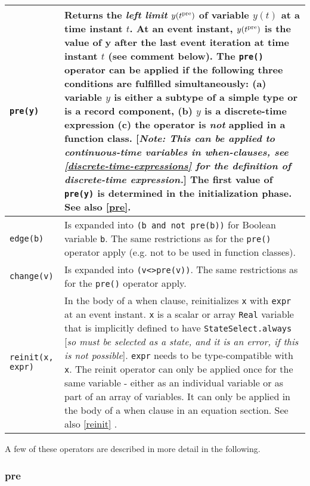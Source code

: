 \begin{longtable}{|p{5cm}|p{8cm}|}
\lstinline!pre(y)! & Returns the \emph{left limit} $y(t\textsuperscript{pre})$ of
variable $y(t)$ at a time instant $t$. At an event instant,
$y(t\textsuperscript{pre})$ is the value of y after the last event
iteration at time instant $t$ (see comment below). The \lstinline!pre()! operator can
be applied if the following three conditions are fulfilled
simultaneously: (a) variable $y$ is either a subtype of a simple type or
is a record component, (b) $y$ is a discrete-time expression (c) the
operator is \emph{not} applied in a function class. {[}\emph{Note: This
can be applied to continuous-time variables in when-clauses, see
\autoref{discrete-time-expressions} for the definition of discrete-time expression.}{]}
The first value of \lstinline!pre(y)! is determined in the initialization phase. See
also \autoref{pre}.\\ \hline

\lstinline!edge(b)! & Is expanded into \lstinline!(b and not pre(b))! for Boolean variable
\lstinline!b!. The same restrictions as for the \lstinline!pre()! operator apply (e.g. not to be
used in function classes).\\ \hline

\lstinline!change(v)! & Is expanded into \lstinline!(v<>pre(v))!. The
same restrictions as for the \lstinline!pre()! operator apply.\\ \hline

\lstinline!reinit(x, expr)! & In the body of a when clause, reinitializes \lstinline!x! with
\lstinline!expr! at an event instant. \lstinline!x! is a scalar or array \lstinline!Real! variable that is implicitly defined to have \lstinline!StateSelect.always!
{[}\emph{so must be selected as a state, and it is an error, if
this is not possible}{]}. \lstinline!expr! needs to be type-compatible with \lstinline!x!. The
reinit operator can only be applied once for the same variable - either
as an individual variable or as part of an array of variables. It can
only be applied in the body of a when clause in an equation section. See
also \autoref{reinit} .\\ \hline

\end{longtable}

A few of these operators are described in more detail in the following.

\subsubsection{pre}

